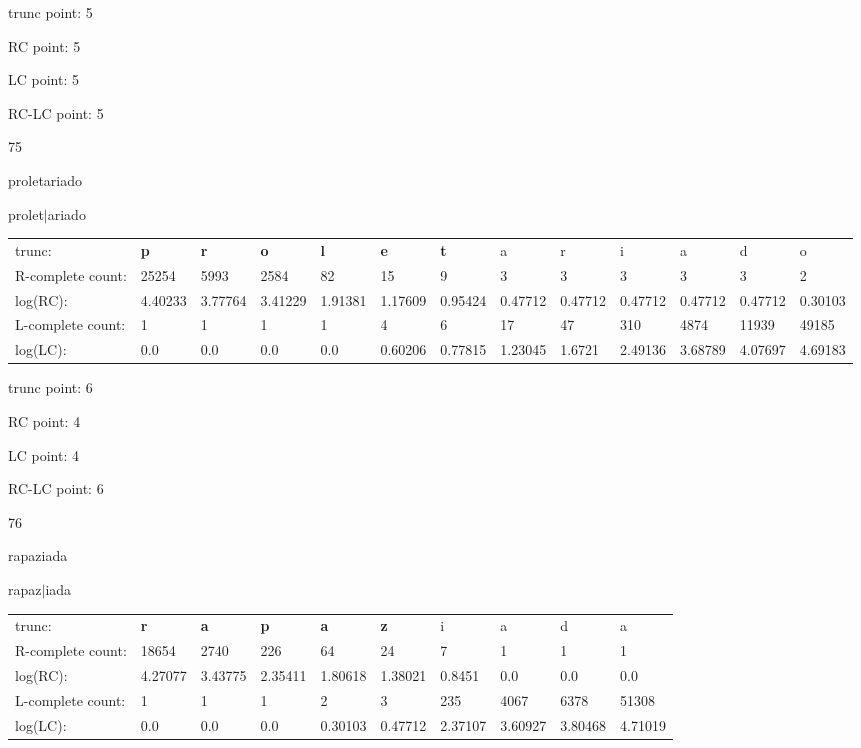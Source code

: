 \documentclass{article}
\begin{document}
trunc point: 5

RC point: 5

LC point: 5

RC-LC point: 5

\vspace{3em}



75

proletariado

prolet$|$ariado

\vspace{1em}

\begin{tabular}{l|llllllllllll}

trunc: & {\color{red}\bf p} & {\color{red}\bf r} & {\color{red}\bf o} & {\color{red}\bf l} & {\color{red}\bf e} & {\color{red}\bf t} & a & r & i & a & d & o \\ 
R-complete count: & 25254 & 5993 & 2584 & 82 & 15 & 9 & 3 & 3 & 3 & 3 & 3 & 2 \\ 
log(RC): & 4.40233 & 3.77764 & 3.41229 & 1.91381 & 1.17609 & 0.95424 & 0.47712 & 0.47712 & 0.47712 & 0.47712 & 0.47712 & 0.30103 \\ 
L-complete count: & 1 & 1 & 1 & 1 & 4 & 6 & 17 & 47 & 310 & 4874 & 11939 & 49185 \\ 
log(LC): & 0.0 & 0.0 & 0.0 & 0.0 & 0.60206 & 0.77815 & 1.23045 & 1.6721 & 2.49136 & 3.68789 & 4.07697 & 4.69183 \\ 
\end{tabular}

trunc point: 6

RC point: 4

LC point: 4

RC-LC point: 6

\vspace{3em}



76

rapaziada

rapaz$|$iada

\vspace{1em}

\begin{tabular}{l|lllllllll}

trunc: & {\color{red}\bf r} & {\color{red}\bf a} & {\color{red}\bf p} & {\color{red}\bf a} & {\color{red}\bf z} & i & a & d & a \\ 
R-complete count: & 18654 & 2740 & 226 & 64 & 24 & 7 & 1 & 1 & 1 \\ 
log(RC): & 4.27077 & 3.43775 & 2.35411 & 1.80618 & 1.38021 & 0.8451 & 0.0 & 0.0 & 0.0 \\ 
L-complete count: & 1 & 1 & 1 & 2 & 3 & 235 & 4067 & 6378 & 51308 \\ 
log(LC): & 0.0 & 0.0 & 0.0 & 0.30103 & 0.47712 & 2.37107 & 3.60927 & 3.80468 & 4.71019 \\ 
\end{tabular}
\end{document}
